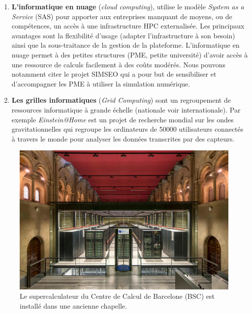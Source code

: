 \begin{enumerate}
        \item \textbf{L'informatique en nuage} (\textit{cloud computing}),  utilise le modèle \textit{System as a Service} (SAS) pour apporter aux entreprises manquant de moyens, ou de compétences, un accès à une infrastructure HPC externalisée. Les principaux avantages sont la flexibilité d'usage (adapter l'infrastructure à son besoin) ainsi que la sous-traitance de la gestion de la plateforme. L'informatique en nuage permet  à des petites structures (PME, petite université) d'avoir accès à une ressource de calculs facilement à des coûts modérés. Nous pouvons notamment citer le projet SIMSEO \cite{Saguez2016} qui a pour but de sensibiliser et d'accompagner les PME à utiliser la simulation numérique. %
        
        \item \textbf{Les grilles informatiques} (\textit{Grid Computing}) sont un regroupement de ressources informatique à grande échelle (nationale voir internationale). Par exemple \textit{Einstein@Home} \cite{Abbott2009} est un projet de recherche mondial sur les ondes gravitationnelles  qui regroupe les ordinateurs de 50000 utilisateurs connectés à travers le monde pour analyser les données transcrites par des capteurs.
    \end{enumerate}
        
        
        \begin{figure}
        \center
        \includegraphics[width=12cm]{images/hpc_bsc_super.jpg}
        \caption{\label{fig:hpc_bsc_super} Le supercalculateur du Centre de Calcul de Barcelone (BSC) est installé dans une ancienne chapelle.}
        \end{figure}
        
